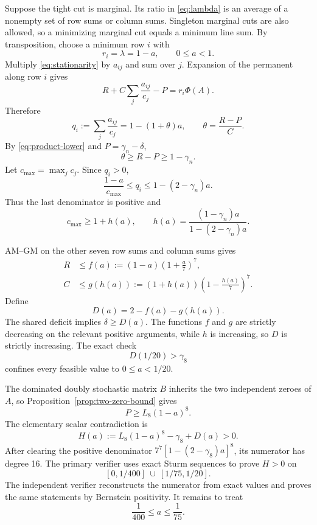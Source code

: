 \documentclass[11pt]{article}
\theoremstyle{remark}
\begin{document}
Suppose the tight cut is marginal.  Its ratio in \eqref{eq:lambda} is an
average of a nonempty set of row sums or column sums.  Singleton marginal cuts
are also allowed, so a minimizing marginal cut equals a minimum line sum.  By
transposition, choose a minimum row $i$ with
\[
 r_i=\lambda=1-a,\qquad 0\le a<1.
\]
Multiply \eqref{eq:stationarity} by $a_{ij}$ and sum over $j$.  Expansion of
the permanent along row $i$ gives
\[
 R+C\sum_j\frac{a_{ij}}{c_j}-P=r_i\Phi(A).
\]
Therefore
\begin{equation}\label{eq:qi}
 q_i:=\sum_j\frac{a_{ij}}{c_j}
 =1-(1+\theta)a,
 \qquad \theta=\frac{R-P}{C}.
\end{equation}
By \eqref{eq:product-lower} and $P=\gamma_n-\delta$,
\begin{equation}\label{eq:theta}
 \theta\ge R-P\ge1-\gamma_n.
\end{equation}
Let $c_{\max}=\max_jc_j$.  Since $q_i>0$,
\[
 \frac{1-a}{c_{\max}}\le q_i\le1-(2-\gamma_n)a.
\]
Thus the last denominator is positive and
\begin{equation}\label{eq:h}
 c_{\max}\ge1+h(a),
 \qquad h(a)=\frac{(1-\gamma_n)a}{1-(2-\gamma_n)a}.
\end{equation}

AM--GM on the other seven row sums and column sums gives
\begin{align}
 R&\le f(a):=(1-a)\left(1+\frac a7\right)^7,
 \label{eq:f}\\
 C&\le g(h(a)):=(1+h(a))\left(1-\frac{h(a)}7\right)^7.
 \label{eq:g}
\end{align}
Define
\begin{equation}\label{eq:D}
 D(a)=2-f(a)-g(h(a)).
\end{equation}
The shared deficit implies $\delta\ge D(a)$.  The functions $f$ and $g$ are
strictly decreasing on the relevant positive arguments, while $h$ is
increasing, so $D$ is strictly increasing.  The exact check
\begin{equation}\label{eq:D-endpoint}
 D(1/20)>\gamma_8
\end{equation}
confines every feasible value to $0\le a<1/20$.

The dominated doubly stochastic matrix $B$ inherits the two independent
zeroes of $A$, so Proposition~\ref{prop:two-zero-bound} gives
\begin{equation}\label{eq:marginal-permanent}
 P\ge L_8(1-a)^8.
\end{equation}
The elementary scalar contradiction is
\begin{equation}\label{eq:H}
 H(a):=L_8(1-a)^8-\gamma_8+D(a)>0.
\end{equation}
After clearing the positive denominator
$7^7[1-(2-\gamma_8)a]^8$, its numerator has degree 16.  The primary verifier
uses exact Sturm sequences to prove $H>0$ on
\begin{equation}\label{eq:safe-intervals}
 [0,1/400]\ \cup\ [1/75,1/20].
\end{equation}
The independent verifier reconstructs the numerator from exact values and
proves the same statements by Bernstein positivity.  It remains to treat
\begin{equation}\label{eq:risk-interval}
 \frac1{400}\le a\le\frac1{75}.
\end{equation}
\end{document}
